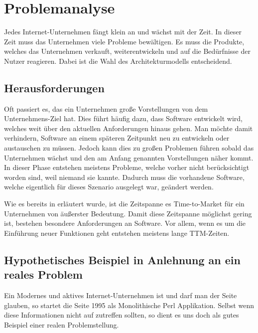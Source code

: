 \chapter{Problemanalyse}
\label{chap:analyse}
Jedes Internet-Unternehmen fängt klein an und wächst mit der Zeit. In dieser Zeit muss das Unternehmen viele Probleme bewältigen. Es muss die Produkte, welches das Unternehmen verkauft, weiterentwickeln und auf die Bedürfnisse der Nutzer reagieren. Dabei ist die Wahl des Architekturmodells entscheidend.

\section{Herausforderungen}
\label{sec:herausforderung}
Oft passiert es, das ein Unternehmen große Vorstellungen von dem Unternehmens-Ziel hat. Dies führt häufig dazu, dass Software entwickelt wird, welches weit über den aktuellen Anforderungen hinaus gehen. Man möchte damit verhindern, Software an einem späteren Zeitpunkt neu zu entwickeln oder austauschen zu müssen. Jedoch kann dies zu großen Problemen führen sobald das Unternehmen wächst und den am Anfang genannten Vorstellungen näher kommt. In dieser Phase entstehen meistens Probleme, welche vorher nicht berücksichtigt worden sind, weil niemand sie kannte. Dadurch muss die vorhandene Software, welche eigentlich für dieses Szenario ausgelegt war, geändert werden.

Wie es bereits in  erläutert wurde, ist die Zeitspanne es Time-to-Market für ein Unternehmen von äußerster Bedeutung. Damit diese Zeitspanne möglichst gering ist, bestehen besondere Anforderungen an Software. Vor allem, wenn es um die Einführung neuer Funktionen geht entstehen meistens lange TTM-Zeiten. 

\section[Beispiel]{Hypothetisches Beispiel in Anlehnung an ein reales Problem}
\label{sec:beispielEbay}
Ein Modernes und aktives Internet-Unternehmen ist \ebay und darf man der Seite \cite{highscalability} glauben, so startet die Seite 1995 als Monolithische Perl Applikation. Selbst wenn diese Informationen nicht auf \ebay zutreffen sollten, so dient es uns doch als gutes Beispiel einer realen Problemstellung.

